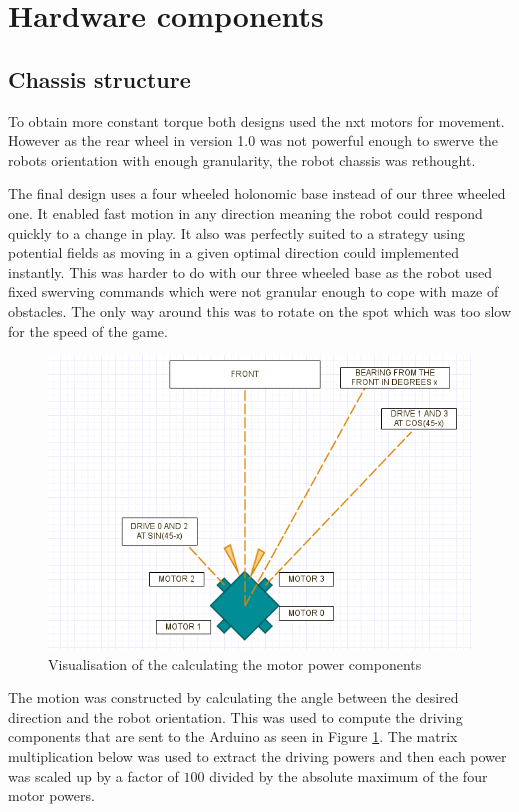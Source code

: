 \documentclass[a4paper,12pt]{article}
\begin{document}
\section{Hardware components}

\subsection{Chassis structure}

To obtain more constant torque both designs used the nxt motors for movement. However as the rear wheel in version 1.0 was not powerful enough to swerve the robots orientation with enough granularity, the robot chassis was rethought.  

The final design uses a four wheeled holonomic base instead of our three wheeled one. It enabled fast motion in any direction meaning the robot could respond quickly to a change in play. It also was perfectly suited to a strategy using potential fields as moving in a given optimal direction could implemented instantly. This was harder to do with our three wheeled base as the robot used fixed swerving commands which were not granular enough to cope with maze of obstacles. The only way around this was to rotate on the spot which was too slow for the speed of the game. 
\begin{figure}[ht!]
\centering
\includegraphics[scale=.4]{holonomics.png}
\caption{Visualisation of the calculating the motor power components}
\label{fig:components}
\end{figure}

The motion was constructed by calculating the angle between the desired direction  and the robot orientation. This was used to compute the driving components that are sent to the Arduino as seen in Figure \ref{fig:components}. The matrix multiplication below was used to extract the driving powers and then each power was scaled up by a factor of $100$ divided by the absolute maximum of the four motor powers.
\end{document}

